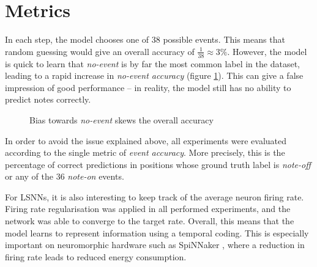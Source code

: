 \documentclass[../../report.tex]{subfiles}
\begin{document}
\section{Metrics}

In each step, the model chooses one of 38 possible events. This means that
random guessing would give an overall accuracy of \(\frac{1}{38} \approx 3\%\).
However, the model is quick to learn that \emph{no-event} is by far the most
common label in the dataset, leading to a rapid increase in \emph{no-event
accuracy} (figure \ref{fig:initial-accuracy}). This can give a false impression
of good performance -- in reality, the model still has no ability to predict
notes correctly.

\begin{figure}
  \centering
  \caption{Bias towards \emph{no-event} skews the overall accuracy}
  \label{fig:initial-accuracy}
\end{figure}

In order to avoid the issue explained above, all experiments were evaluated
according to the single metric of \emph{event accuracy}. More precisely, this is
the percentage of correct predictions in positions whose ground truth label is
\emph{note-off} or any of the 36 \emph{note-on} events.

For LSNNs, it is also interesting to keep track of the average neuron firing
rate. Firing rate regularisation was applied in all performed experiments, and
the network was able to converge to the target rate. Overall, this means that
the model learns to represent information using a temporal coding. This is
especially important on neuromorphic hardware such as SpiNNaker
\cite{Furber2014}, where a reduction in firing rate leads to reduced energy
consumption.

\end{document}
